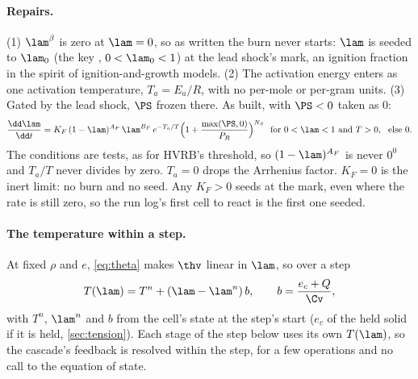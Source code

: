 \paragraph{Repairs.} (1) $\lam^\beta$ is zero at $\lam = 0$, so as written
the burn never starts: $\lam$ is seeded to $\lam_0$ (the key ,
$0 < \lam_0 < 1$) at the lead shock's mark, an ignition fraction in the
spirit of ignition-and-growth models. (2) The activation energy enters as one
activation temperature, $T_a = E_a/R$, with no per-mole or per-gram units.
(3) Gated by the lead shock, $\PS$ frozen there. As built, with $\PS < 0$
taken as 0:
\begin{equation}
  \frac{\dd\lam}{\dd t} = K_F\,(1 - \lam)^{A_F}\,\lam^{B_F}\,
  e^{-T_a/T}\Bigl(1 + \frac{\max(\PS, 0)}{P_R}\Bigr)^{N_S}
  \ \text{ for } 0 < \lam < 1 \text{ and } T > 0, \ \text{ else } 0.
  \label{eq:ff-rate}
\end{equation}
The conditions are tests, as for HVRB's threshold, so $(1 - \lam)^{A_F}$ is
never $0^0$ and $T_a/T$ never divides by zero. $T_a = 0$ drops the Arrhenius
factor. $K_F = 0$ is the inert limit: no burn and no seed. Any $K_F > 0$ seeds at
the mark, even where the rate is still zero, so the run log's first cell to
react is the first one seeded.

\paragraph{The temperature within a step.} At fixed $\rho$ and $e$,
\cref{eq:theta} makes $\thv$ linear in $\lam$, so over a step
\begin{equation}
  T(\lam) = T^n + (\lam - \lam^n)\,b, \qquad b = \frac{e_c + Q}{\Cv},
  \label{eq:ff-T}
\end{equation}
with $T^n$, $\lam^n$ and $b$ from the cell's state at the step's start ($e_c$
of the held solid if it is held, \cref{sec:tension}). Each stage of the step
below uses its own $T(\lam)$, so the cascade's feedback is resolved within
the step, for a few operations and no call to the equation of state.

